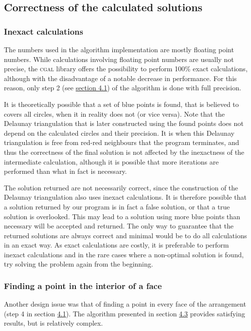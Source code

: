 \documentclass[a4paper,12pt]{article}
\begin{document}
\subsection{Correctness of the calculated solutions}
\subsubsection*{Inexact calculations}

The numbers used in the algorithm implementation are mostly floating point numbers. While calculations involving floating point numbers are usually not precise, the \textsc{cgal} library offers the possibility to perform 100\% exact calculations, although with the disadvantage of a notable decrease in performance. For this reason, only step 2 (see \hyperref[ref:Algorithm]{section 4.1}) of the algorithm is done with full precision.

It is theoretically possible that a set of blue points is found, that is believed to covers all circles, when it in reality does not (or vice versa). Note that the Delaunay triangulation that is later constructed using the found points does not depend on the calculated circles and their precision. It is when this Delaunay triangulation is free from red-red neighbours that the program terminates, and thus the correctness of the final solution is not affected by the inexactness of the intermediate calculation, although it is possible that more iterations are performed than what in fact is necessary.

The solution returned are not necessarily correct, since the construction of the Delaunay triangulation also uses inexact calculations. It is therefore possible that a solution returned by our program is in fact a false solution, or that a true solution is overlooked. This may lead to a solution using more blue points than necessary will be accepted and returned. The only way to guarantee that the returned solutions are always correct and minimal would be to do all calculations in an exact way. As exact calculations are costly, it is preferable to perform inexact calculations and in the rare cases where a non-optimal solution is found, try solving the problem again from the beginning.

\subsubsection*{Finding a point in the interior of a face}

Another design issue was that of finding a point in every face of the arrangement (step 4 in section \hyperref[ref:Algorithm]{4.1}). The algorithm presented in section \hyperref[sec:findPoints]{4.3} provides satisfying results, but is relatively complex.
\end{document}
